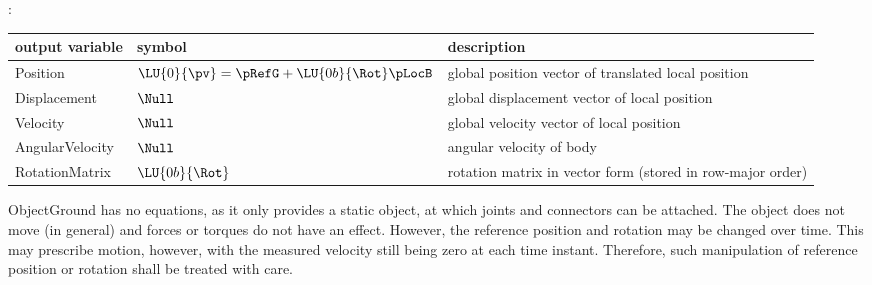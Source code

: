 :
\begin{center}
\footnotesize
\begin{longtable}{| p{5cm} | p{5cm} | p{6cm} |} 
\hline
\bf output variable & \bf symbol & \bf description \\ \hline
Position & $\LU{0}{\pv} = \pRefG + \LU{0b}{\Rot} \pLocB$ & global position vector of translated local position\\ \hline
Displacement & $\Null$ & global displacement vector of local position\\ \hline
Velocity & $\Null$ & global velocity vector of local position\\ \hline
AngularVelocity & $\Null$ & angular velocity of body\\ \hline
RotationMatrix & $\LU{0b}{\Rot}$ & rotation matrix in vector form (stored in row-major order)\\ \hline
\end{longtable}
\end{center}
 \noindent
    ObjectGround has no equations, as it only provides a static object, at which joints and connectors can be attached. 
    The object does not move (in general) and forces or torques do not have an effect.
    However, the reference position and rotation may be changed over time. This may prescribe
    motion, however, with the measured velocity still being zero at each time instant. Therefore,
    such manipulation of reference position or rotation shall be treated with care.
    

